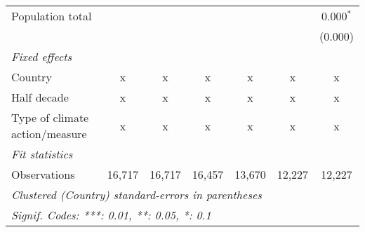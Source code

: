 \begin{tabular}{lcccccc}
   Population total                     &         &         &             &         &         & 0.000$^{*}$\\   
                                        &         &         &             &         &         & (0.000)\\   
   \emph{Fixed effects}\\
   Country                              & x       & x       & x           & x       & x       & x\\  
   Half decade                          & x       & x       & x           & x       & x       & x\\  
   Type of climate action/measure       & x       & x       & x           & x       & x       & x\\  
   \midrule \emph{Fit statistics}\\
   Observations                         & 16,717  & 16,717  & 16,457      & 13,670  & 12,227  & 12,227\\  
   \midrule
   \multicolumn{7}{l}{\emph{Clustered (Country) standard-errors in parentheses}}\\
   \multicolumn{7}{l}{\emph{Signif. Codes: ***: 0.01, **: 0.05, *: 0.1}}\\
\end{tabular}
\par\endgroup


